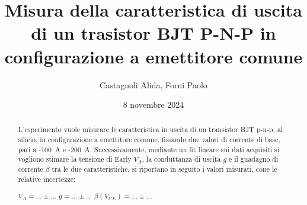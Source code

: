 \documentclass[11pt]{article}
\begin{document}

    \title{\textbf{
        Misura della caratteristica di uscita di un trasistor BJT P-N-P in configurazione
        a emettitore comune
    }}
    \author{Castagnoli Alida, Forni Paolo}
    \date{8 novembre 2024}
    \maketitle


    \vspace{-23pt}  %

    \begin{abstract}
        L'esperimento vuole misurare le caratteristica in uscita
        di un transistor BJT p-n-p, al silicio, in configurazione a
        emettitore comune, fissando due valori di corrente di base,
        pari a -100~\textmu A e -200~\textmu A. Successivamente, mediante
        un fit lineare sui dati acquisiti si vogliono stimare la tensione
        di Early $V_A$, la conduttanza di uscita $g$ e il guadagno di corrente
        $\beta$ tra le due caratteristiche, si riportano in seguito i valori
        misurati, cone le relative incertezze:

        \begin{center}
            $V_A = ...\pm ...$ \;\;\;\;\; $g = ...\pm ...$ \;\;\;\;\; $\beta(V_{CE}) = ...\pm ...$
        \end{center}

    \end{abstract}
    
    
    \clearpage
    
    
    \newpage

    \appendix
    
\end{document}
